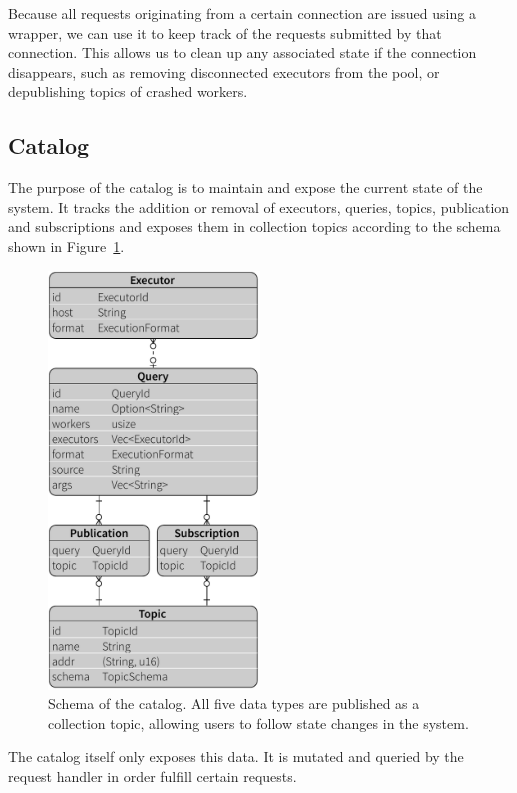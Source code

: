 Because all requests originating from a certain connection are issued using a
wrapper, we can use it to keep track of the requests submitted by that connection.
This allows us to clean up any associated state if the connection disappears,
such as removing disconnected executors from the pool, or depublishing 
topics of crashed workers.

\subsection{Catalog}

The purpose of the catalog is to maintain and expose the current state of the
system. It tracks the addition or removal of executors, queries, topics,
publication and subscriptions and exposes them in collection topics according
to the schema shown in Figure~\ref{fig:model}.

\begin{figure}[htb]
  \centering
    \includegraphics[width=0.5\textwidth]{figures/model}
  \caption[Schema of the catalog.]{Schema of the catalog. All five data types
  are published as a collection topic, allowing users to follow state changes
  in the system.}
  \label{fig:model}
\end{figure}

The catalog itself only exposes this data. It is mutated and queried by the
request handler in order fulfill certain requests.

